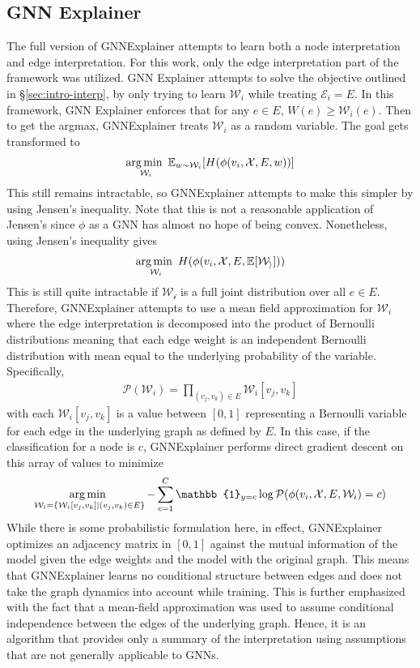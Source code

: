 \subsection{GNN Explainer}
The full version of GNNExplainer attempts to learn both a node interpretation and edge interpretation. For this work, only the edge interpretation part of the framework was utilized. GNN Explainer attempts to solve the objective outlined in \S\ref{sec:intro-interp}, by only trying to learn $\mathcal{W}_i$ while treating $\mathcal{E}_i = E$. In this framework, GNN Explainer enforces that for any $e \in E$, $W(e) \geq \mathcal{W}_i(e)$. Then to get the argmax, GNNExplainer treats $\mathcal{W}_i$ as a random variable. The goal gets transformed to 
\begin{align*}
	\operatorname*{arg\,min\,\,}_{\mathcal{W}_i} \mathbb{E}_{w \sim \mathcal{W}_i} [H(\phi(v_i, \mathcal{X}, E, w))]
\end{align*}
This still remains intractable, so GNNExplainer attempts to make this simpler by using Jensen's inequality. Note that this is not a reasonable application of Jensen's since $\phi$ as a GNN has almost no hope of being convex. Nonetheless, using Jensen's inequality gives
\begin{align*}
	\operatorname*{arg\,min\,\,}_{\mathcal{W}_i} H(\phi(v_i, \mathcal{X}, E, \mathbb{E}[\mathcal{W_i}]))
\end{align*}
This is still quite intractable if $\mathcal{W_i}$ is a full joint distribution over all $e \in E$. Therefore, GNNExplainer attempts to use a mean field approximation for $\mathcal{W}_i$ where the edge interpretation is decomposed into the product of Bernoulli distributions meaning that each edge weight is an independent Bernoulli distribution with mean equal to the underlying probability of the variable. Specifically,
\begin{align*}
	\mathcal{P}(\mathcal{W}_i) = \prod_{(v_j, v_k) \in E} \mathcal{W}_i[v_j, v_k]
\end{align*}
with each $\mathcal{W}_i[v_j, v_k]$ is a value between $[0, 1]$ representing a Bernoulli variable for each edge in the underlying graph as defined by $E$. In this case, if the classification for a node is $c$, GNNExplainer performs direct gradient descent on this array of values to minimize
\begin{align*}
	\argmin_{\mathcal{W}_i = \{\mathcal{W}_i[v_j, v_k] \mid (v_j, v_k) \in E\}} -\sum_{c=1}^C \mathbb{1}_{y = c} \log \mathcal{P}(\phi(v_i, \mathcal{X}, E, \mathcal{W}_i) = c)
\end{align*}
While there is some probabilistic formulation here, in effect, GNNExplainer optimizes an adjacency matrix in $[0, 1]$ against the mutual information of the model given the edge weights and the model with the original graph. This means that GNNExplainer learns no conditional structure between edges and does not take the graph dynamics into account while training. This is further emphasized with the fact that a mean-field approximation was used to assume conditional independence between the edges of the underlying graph. Hence, it is an algorithm that provides only a summary of the interpretation using assumptions that are not generally applicable to GNNs.
